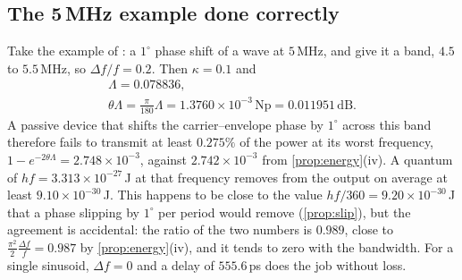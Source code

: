 \subsection{The 5\,MHz example done correctly}

Take the example of \cite{tb23}: a $1^\circ$ phase shift of a wave at
$5$\,MHz, and give it a band, $4.5$ to $5.5$\,MHz, so $\Delta f/f=0.2$. Then
$\kappa=0.1$ and
\begin{gather*}
\Lambda=0.078836,\\
\theta\Lambda=\frac\pi{180}\Lambda=1.3760\times10^{-3}\,\text{Np}
=0.011951\,\text{dB}.
\end{gather*}
A passive device that shifts the carrier--envelope phase by $1^\circ$
across this band therefore fails to transmit at least $0.275\%$ of the power
at its worst frequency, $1-e^{-2\theta\Lambda}=2.748\times10^{-3}$, against
$2.742\times10^{-3}$ from \cref{prop:energy}(iv). A quantum of
$hf=3.313\times10^{-27}$\,J at that frequency removes from the output on average at least
$9.10\times10^{-30}$\,J. This happens to be close to the value
$hf/360=9.20\times10^{-30}$\,J that a phase slipping by $1^\circ$ per period
would remove (\cref{prop:slip}), but the agreement is accidental: the ratio
of the two numbers is $0.989$, close to
$\frac{\pi^2}2\frac{\Delta f}f=0.987$ by \cref{prop:energy}(iv), and it
tends to zero with the bandwidth. For a single sinusoid,
$\Delta f=0$ and a delay of $555.6$\,ps does the job without loss.
